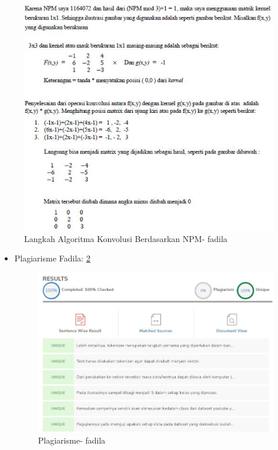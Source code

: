 \begin{enumerate}
\begin{itemize}
\par
\begin{figure}[!hbtp]
\centering
\includegraphics[scale=0.52]{figures/chapter-7-algoritma-konvolusi-fadila.jpg}
\caption{Langkah Algoritma Konvolusi Berdasarkan NPM- fadila}
\label{chapter-7-algoritma-konvolusi-fadila}
\end{figure}
\par
\par
\end{itemize}
\end{enumerate}

\begin{itemize}
\item  Plagiarisme Fadila: \ref{chapter-7-plagiarisme-fadila}
\par
\begin{figure}[!hbtp]
\centering
\includegraphics[scale=0.3]{figures/chapter-7-plagiarisme-fadila.jpg}
\caption{Plagiarisme- fadila}
\label{chapter-7-plagiarisme-fadila}
\end{figure}
\par
\par
\end{itemize}



